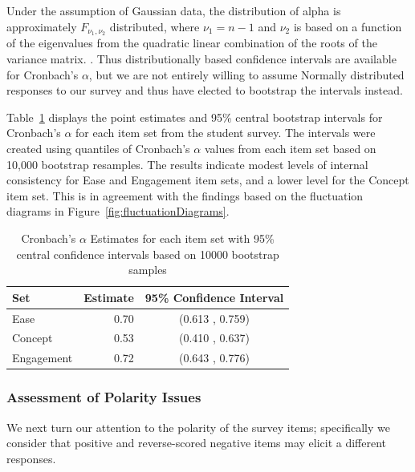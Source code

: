 \documentclass{article}\usepackage[]{graphicx}\usepackage[]{color}
\newcommand{\km}[1]{{\color{Orange} #1}}
\begin{document}
\km{  Under the assumption of Gaussian data, the distribution of alpha is approximately $F_{\nu_1,\nu_2}$ distributed, where $\nu_1 = n-1$ and $\nu_2$ is based on a function of the eigenvalues from the quadratic linear combination of the roots of the variance matrix. \citep{KistnerMuller2004}.  Thus distributionally based confidence intervals are available for Cronbach's $\alpha$, but we are not entirely willing to assume Normally distributed responses to our survey and thus have elected to bootstrap the intervals instead.\\  }


Table~\ref{cronbachstuff} displays the point estimates and 95\% central bootstrap intervals for Cronbach's $\alpha$ for each item set from the student survey.  The intervals were created using quantiles of Cronbach's $\alpha$ values from each item set based on 10,000 bootstrap resamples. 
 The results indicate modest levels of internal consistency for Ease and Engagement item sets, and a lower level for the Concept item set. This is in agreement with the findings based on the fluctuation diagrams in Figure~\ref{fig:fluctuationDiagrams}. 



\begin{table}[hbtp]
\centering
\begin{tabular}{lrc}
  \hline
Set & Estimate & 95\% Confidence Interval \\ 
  \hline
Ease & 0.70 & (0.613 , 0.759)\\ 
  Concept & 0.53 & (0.410 , 0.637) \\ 
  Engagement & 0.72 & (0.643 , 0.776) \\ 
   \hline
\end{tabular}
\caption{Cronbach's $\alpha$ Estimates for each item set with 95\% central confidence intervals based on 10000 bootstrap samples} 
\label{cronbachstuff}
\end{table}

\subsubsection{Assessment of Polarity Issues}  

We next turn our attention to the polarity of the survey items; specifically we consider that positive and reverse-scored negative items may elicit a different responses.  
\end{document}
